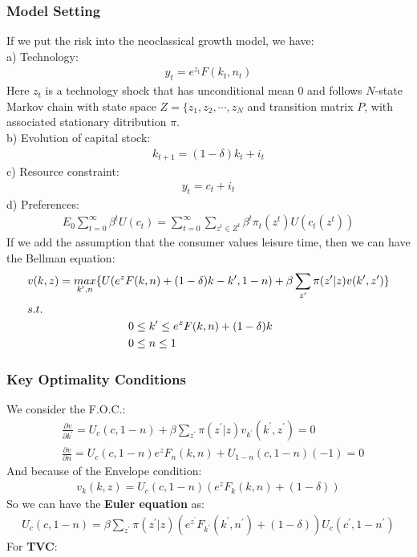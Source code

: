 \documentclass{article}
\begin{document}
\subsubsection{Model Setting}
If we put the risk into the neoclassical growth model, we have:\\
\indent a) Technology:
\begin{align*}
	y_t = e^{z_t} F(k_t, n_t)
\end{align*} 
\indent\indent Here $z_t$ is a technology shock that has unconditional mean 0 and follows $N$-state Markov chain with state space $Z = \{z_1, z_2, \cdots, z_N$ and transition matrix $P$, with associated stationary ditribution $\pi$.\\
\indent b) Evolution of capital stock:
\begin{align*}
	k_{t+1} = (1 - \delta)k_t + i_t
\end{align*}
\indent c) Resource constraint:
\begin{align*}
	y_t = c_t + i_t
\end{align*}
\indent d) Preferences:
\begin{align*}
	E_0 \sum\limits^\infty_{t=0} \beta^t U(c_t) = \sum\limits^\infty_{t=0} \sum\limits_{z^t \in Z^t} \beta^t \pi_t(z^t) U(c_t(z^t))
\end{align*}
If we add the assumption that the consumer values leisure time, then we can have the Bellman equation:
\begin{align*}
	&v(k, z) = \mathop{max}\limits_{k^\prime, n} \{U(e^z F(k, n) + (1 - \delta)k - k^\prime, 1 -n) + \beta \sum\limits_{z^\prime} \pi(z^\prime|z)v(k^\prime, z^\prime)\}\\
	&s.t.\\
	&\indent\indent\indent\indent\indent\indent 0 \leq k^\prime \leq e^z F(k, n) + (1 - \delta)k\\
	&\indent\indent\indent\indent\indent\indent 0 \leq n \leq 1
\end{align*}

\subsubsection{Key Optimality Conditions}
We consider the F.O.C.:\\
\begin{align*}
	&\frac{\partial v}{\partial k^\prime} = U_c(c, 1-n) + \beta \sum\limits_{z^\prime} \pi(z^\prime|z)v_{k^\prime}(k^\prime, z^\prime) = 0\\
	&\frac{\partial v}{\partial n} = U_c(c, 1 - n) e^z F_n(k, n) + U_{1-n}(c, 1 - n)(-1) = 0
\end{align*}
And because of the Envelope condition:
\begin{align*}
	v_k(k, z) = U_c(c, 1 - n)(e^z F_k(k, n) + (1 - \delta))
\end{align*}
So we can have the \textbf{Euler equation} as:
\begin{align*}
	U_c(c, 1 - n) = \beta \sum\limits_{z^\prime} \pi(z^\prime|z) (e^{z^\prime} F_{k^\prime}(k^\prime, n^\prime) + (1 - \delta)) U_c(c^\prime, 1 - n^\prime)
\end{align*}
For \textbf{TVC}:
\end{document}
